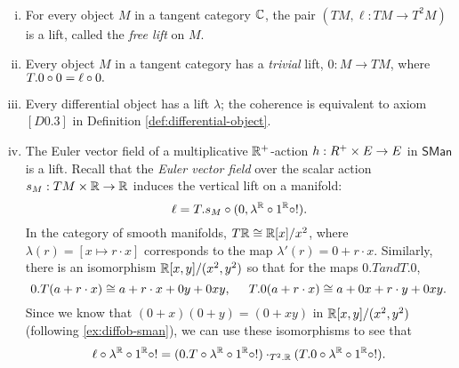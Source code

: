 \begin{example}
  \label{ex:lift-examples}
  ~\begin{enumerate}[(i)]
    \item For every object $M$ in a tangent category $\mathbb{C}$, the pair $(TM, \ell:TM \to T^2M)$ is a lift, called the \emph{free lift} on $M$.
    \item Every object $M$ in a tangent category has a \emph{trivial} lift, $0:M \to TM$, where $T.0 \circ 0 = \ell \circ 0.$
    \item Every differential object has a lift $\lambda$; the coherence is equivalent to axiom $[D0.3]$ in Definition \ref{def:differential-object}. 
    \item %
    The Euler vector field of a multiplicative $\mathbb{R}^+$-action $h:R^+ \times E \to E$ in $\mathsf{SMan}$ is a lift.
      Recall that the \textit{Euler vector field} over the scalar action $s_M: TM \times \mathbb{R} \to \mathbb{R}$ induces the vertical lift on a manifold:
      \[
          \ell = T.s_M \circ (0, \lambda^{\mathbb{R}} \circ 1^{\mathbb{R}} \circ !).
      \]
      In the category of smooth manifolds, $T\mathbb{R} \cong \mathbb{R}[x]/x^2$, where $\lambda(r) = [x \mapsto r\cdot x]$ corresponds to the map $\lambda'(r) = 0 + r\cdot x$. Similarly, there is an isomorphism $\mathbb{R}[x,y]/(x^2,y^2)$ so that for the maps $0.T and T.0$,
      \[
          0.T(a + r\cdot x) \cong a + r\cdot x + 0y + 0xy,\hspace{0.5cm}
          T.0(a + r\cdot x) \cong a + 0x + r\cdot y + 0xy.
      \]
      Since we know that $(0 + x)(0 + y) = (0 + xy)$ in $\mathbb{R}[x,y]/(x^2,y^2)$ (following \ref{ex:diffob-sman}), we can use these isomorphisms to see that
      \[
          \ell \circ \lambda^{\mathbb{R}} \circ 1^{\mathbb{R}} \circ != 
          (0.T \circ \lambda^{\mathbb{R}} \circ 1^{\mathbb{R}} \circ !) \cdot_{T^2.\mathbb{R}} (T.0\circ \lambda^{\mathbb{R}}\circ 1^{\mathbb{R}} \circ !).
      \]
  

\end{enumerate}
\end{example}
